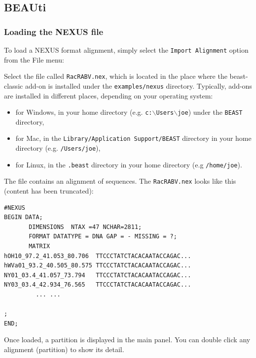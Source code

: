 \documentclass{article}
\begin{document}
\subsection*{BEAUti}


\subsubsection*{Loading the NEXUS file }

To load a NEXUS format alignment, simply select the \texttt{Import
Alignment} option from the File menu: 

Select the file called \texttt{RacRABV.nex}, which is located in the place where the beast-classic add-on is installed 
under the {\tt examples/nexus} directory. Typically, add-ons are installed in different places, depending on your operating system:
\begin{itemize}
\item for Windows, in your home directory (e.g. {\tt c:$\backslash$Users$\backslash$joe}) under the {\tt BEAST} directory,
\item for Mac, in the {\tt Library/Application Support/BEAST} directory in your home directory (e.g. {\tt /Users/joe}),
\item for Linux, in the {\tt .beast} directory in your home directory (e.g {\tt /home/joe}).
\end{itemize}
The file contains an alignment of sequences. The \texttt{RacRABV.nex} looks like this (content has been truncated):

\begin{verbatim}
#NEXUS
BEGIN DATA;
       DIMENSIONS  NTAX =47 NCHAR=2811;
       FORMAT DATATYPE = DNA GAP = - MISSING = ?;
       MATRIX   
hOH10_97.2_41.053_80.706  TTCCCTATCTACACAATACCAGAC...
hWVa01_93.2_40.505_80.575 TTCCCTATCTACACAATACCAGAC...
NY01_03.4_41.057_73.794   TTCCCTATCTACACAATACCAGAC...
NY03_03.4_42.934_76.565   TTCCCTATCTACACAATACCAGAC...
         ... ...

;
END;
\end{verbatim}

\medskip{}

Once loaded, a partition is displayed in the main panel.
You can double click any alignment (partition) to show its detail.
\end{document}
